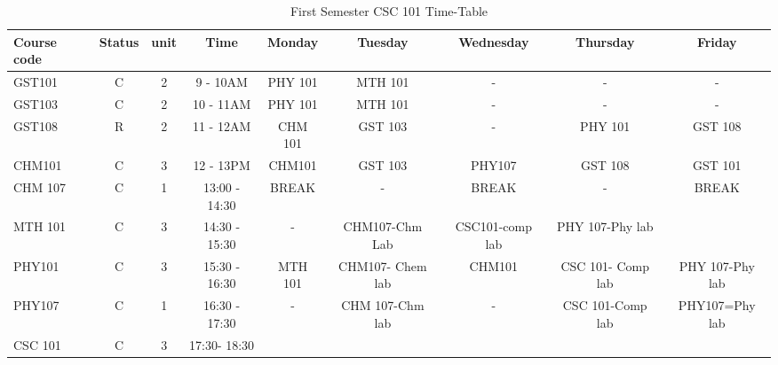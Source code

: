 \documentclass{article}
\begin{document}
\begin{sidewaystable}[!ht]	
	\begin{center}
		
\caption{First Semester CSC 101 Time-Table}	
	\label{tab:table1}	
	\begin{tabular}{l|c|c|c|c|c|c|c|c|}
		\hline
\textbf{Course code}  &\cellcolor{green!25} \textbf{Status} & \cellcolor{blue!35}\textbf{unit} & \cellcolor{red!35}\textbf{Time} &\cellcolor{blue!25} \textbf{Monday}  &\cellcolor{blue!25}\textbf{Tuesday}  & \cellcolor{green!20}\textbf{Wednesday} & \cellcolor{green!20}\textbf{Thursday}  & \cellcolor{green!20}\textbf{Friday}\\
\hline
\cellcolor{green!25}GST101 & C & 2 & 9 - 10AM & PHY 101 & MTH 101 & -& - & - \\
\hline 
\cellcolor{red!25}GST103  & C & 2 & 10 - 11AM & PHY 101 & MTH 101 & -&-&-\\
\hline
\cellcolor{blue!35}GST108 & R & 2& 11 - 12AM & CHM 101 & GST 103 & - & PHY 101 & GST 108 \\
\hline
\cellcolor{green!25}CHM101 & C & 3 & 12 - 13PM & CHM101 & GST 103 & PHY107 & GST 108 & GST 101\\
\hline
\cellcolor{red!25}CHM 107  & C & 1 & 13:00 - 14:30 & BREAK & - & BREAK & - & BREAK\\
\hline
\cellcolor{blue!25}MTH 101 & C & 3 & 14:30 - 15:30 &
-& CHM107-Chm Lab
& CSC101-comp lab &PHY 107-Phy lab &\\
\hline
\cellcolor{green!20}PHY101 &C & 3 & 15:30 - 16:30 & MTH 101 & CHM107- Chem lab & CHM101 & CSC 101- Comp lab & PHY 107-Phy lab\\
\hline
\cellcolor{blue!20}PHY107 &
C & 1 & 16:30 - 17:30 & -  & CHM 107-Chm lab & -& CSC 101-Comp lab & PHY107=Phy lab\\
\hline
\cellcolor{red!20}CSC 101& C & 3 & 17:30- 18:30 & & & & & \\
\hline

\end{tabular}
\end{center}
\end{sidewaystable}
\end{document}
